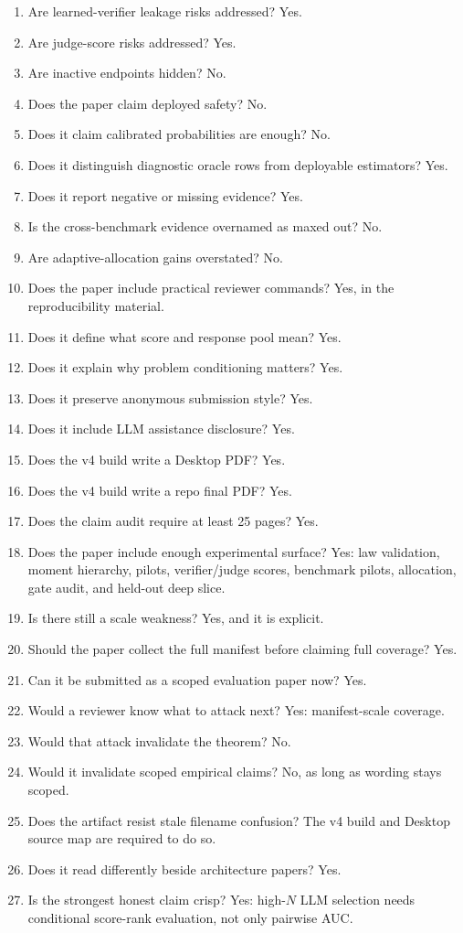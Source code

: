 \begin{enumerate}[leftmargin=*]
selection-law spine; the paper identity and evidence are LLM response pools.
\item Are learned-verifier leakage risks addressed? Yes.
\item Are judge-score risks addressed? Yes.
\item Are inactive endpoints hidden? No.
\item Does the paper claim deployed safety? No.
\item Does it claim calibrated probabilities are enough? No.
\item Does it distinguish diagnostic oracle rows from deployable estimators?
Yes.
\item Does it report negative or missing evidence? Yes.
\item Is the cross-benchmark evidence overnamed as maxed out? No.
\item Are adaptive-allocation gains overstated? No.
\item Does the paper include practical reviewer commands? Yes, in the
reproducibility material.
\item Does it define what score and response pool mean? Yes.
\item Does it explain why problem conditioning matters? Yes.
\item Does it preserve anonymous submission style? Yes.
\item Does it include LLM assistance disclosure? Yes.
\item Does the v4 build write a Desktop PDF? Yes.
\item Does the v4 build write a repo final PDF? Yes.
\item Does the claim audit require at least 25 pages? Yes.
\item Does the paper include enough experimental surface? Yes: law validation,
moment hierarchy, pilots, verifier/judge scores, benchmark pilots, allocation,
gate audit, and held-out deep slice.
\item Is there still a scale weakness? Yes, and it is explicit.
\item Should the paper collect the full manifest before claiming full coverage?
Yes.
\item Can it be submitted as a scoped evaluation paper now? Yes.
\item Would a reviewer know what to attack next? Yes: manifest-scale coverage.
\item Would that attack invalidate the theorem? No.
\item Would it invalidate scoped empirical claims? No, as long as wording stays
scoped.
\item Does the artifact resist stale filename confusion? The v4 build and
Desktop source map are required to do so.
\item Does it read differently beside architecture papers? Yes.
\item Is the strongest honest claim crisp? Yes: high-$N$ LLM selection needs
conditional score-rank evaluation, not only pairwise AUC.
\end{enumerate}


